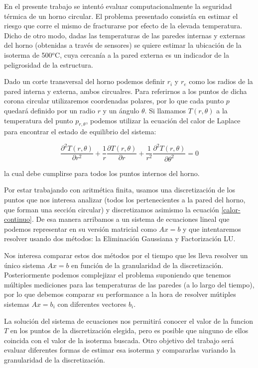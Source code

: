 En el presente trabajo se intentó evaluar computacionalmente la seguridad térmica de un horno circular. El problema presentado consistía en estimar el riesgo que corre el mismo de fracturarse por efecto de la elevada temperatura. Dicho de otro modo, dadas las temperaturas de las paredes internas y externas del horno (obtenidas a través de sensores) se quiere estimar la ubicación de la isoterma de 500$^{o}$C, cuya cercanía a la pared externa es un indicador de la peligrosidad de la estructura.

Dado un corte transversal del horno podemos definir $r_i$ y $r_e$ como los radios de la pared interna y externa, ambos circualres. Para referirnos a los puntos de dicha corona circular utilizaremos coordenadas polares, por lo que cada punto $p$ quedará definido por un radio $r$ y un ángulo $\theta$. Si llamamos $T(r,\theta)$ a la temperatura del punto $p_{r, \theta}$, podemos utilizar la ecuación del calor de Laplace para encontrar el estado de equilibrio del sistema:

\begin{equation}\label{calor-continuo}
\frac{\partial^2T(r,\theta)}{\partial r^2}+\frac{1}{r}\frac{\partial T(r,\theta)}{\partial r}+\frac{1}{r^2}\frac{\partial^2T(r,\theta)}{\partial \theta^2} = 0 
\end{equation}

la cual debe cumplirse para todos los puntos internos del horno.

Por estar trabajando con aritmética finita, usamos una discretización de los puntos que nos interesa analizar (todos los pertenecientes a la pared del horno, que forman una sección circular) y discretizamos asimismo la ecuación \ref{calor-continuo}. De esa manera arribamos a un sistema de ecuaciones lineal que podemos representar en su versión matricial como $Ax=b$ y que intentaremos resolver usando dos métodos: la Eliminación Gaussiana y Factorización LU.

Nos interesa comparar estos dos métodos por el tiempo que les lleva resolver un único sistema $Ax=b$ en función de la granularidad de la discretización. Posteriormente podemos complejizar el problema suponiendo que tenemos múltiples mediciones para las temperaturas de las paredes (a lo largo del tiempo), por lo que debemos comparar su performance a la hora de resolver mútiples sistemas $Ax=b_i$ con diferentes vectores $b_i$.

La solución del sistema de ecuaciones nos permitirá conocer el valor de la funcion $T$ en los puntos de la discretización elegida, pero es posible que ninguno de ellos coincida con el valor de la isoterma buscada. Otro objetivo del trabajo será evaluar diferentes formas de estimar esa isoterma y compararlas variando la granularidad de la discretización.

